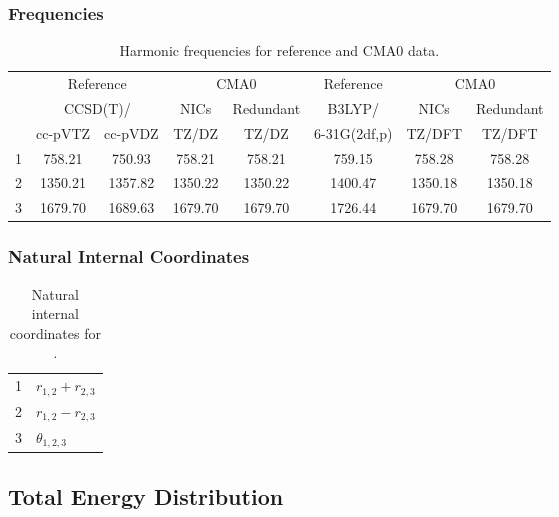 \documentclass[10pt,oneside]{article}
\begin{document}
\begin{table}[h!]
\subsubsection*{Frequencies}
\centering
\caption{Harmonic frequencies for reference and CMA0 data.}
\begin{tabular}{cccccccc}
\toprule
{} & \multicolumn{2}{c}{Reference} & \multicolumn{2}{c}{CMA0} &    Reference & \multicolumn{2}{c}{CMA0} \\
{} & \multicolumn{2}{c}{CCSD(T)/} &    NICs &  Redundant &       B3LYP/ &    NICs & Redundant \\
{} &   cc-pVTZ & cc-pVDZ &   TZ/DZ &      TZ/DZ & 6-31G(2df,p) &  TZ/DFT &    TZ/DFT \\
\midrule
1 &    758.21 &  750.93 &  758.21 &     758.21 &       759.15 &  758.28 &    758.28 \\
2 &   1350.21 & 1357.82 & 1350.22 &    1350.22 &      1400.47 & 1350.18 &   1350.18 \\
3 &   1679.70 & 1689.63 & 1679.70 &    1679.70 &      1726.44 & 1679.70 &   1679.70 \\
\bottomrule
\end{tabular}
\end{table}

\begin{table}[h!]
\subsubsection*{Natural Internal Coordinates}
\centering
\caption{Natural internal coordinates for .}
\small
\begin{tabular}{ll}
\toprule
  1   & $r_{1,2} + r_{2,3}$ \\
  2   & $r_{1,2} - r_{2,3}$ \\
  3   & $\theta_{1,2,3}$ \\
\bottomrule
\end{tabular}
\end{table}

\begin{table}
\subsection*{Total Energy Distribution}
\centering\end{table}

\clearpage

\subsection{}
\end{document}
